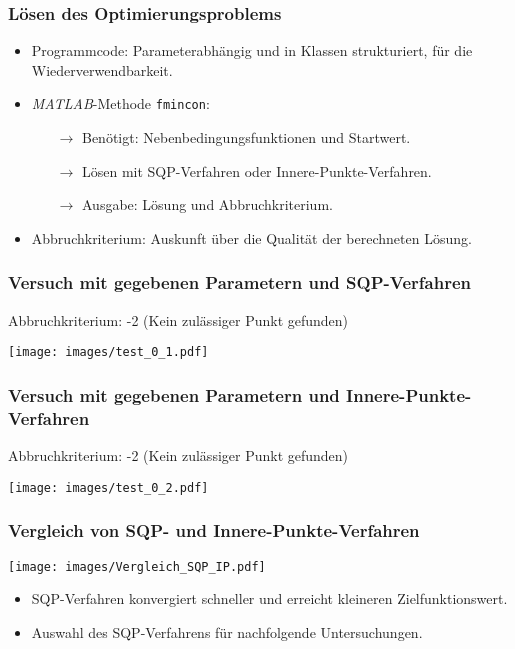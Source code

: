 \documentclass[aspectratio=169]{beamer}
\begin{document}
\begin{frame}
  	\frametitle{Lösen des Optimierungsproblems}
  	\begin{itemize}
  		\item Programmcode: Parameterabhängig und in Klassen strukturiert, für die Wiederverwendbarkeit.
  		\item \textit{MATLAB}-Methode \texttt{fmincon}:
  			\begin{itemize}
  				\item[\(\rightarrow\)] Benötigt: Nebenbedingungsfunktionen und Startwert.
      			\item[\(\rightarrow\)] Lösen mit SQP-Verfahren oder Innere-Punkte-Verfahren.
      			\item[\(\rightarrow\)] Ausgabe: Lösung und Abbruchkriterium.
    		\end{itemize}
    	\item Abbruchkriterium: Auskunft über die Qualität der berechneten Lösung.
  	\end{itemize}
\end{frame}

\begin{frame}
	\frametitle{Versuch mit gegebenen Parametern und SQP-Verfahren}
	Abbruchkriterium: -2 (Kein zulässiger Punkt gefunden)
  	\begin{center}
  		\texttt{[image: images/test\_0\_1.pdf]}
  	\end{center}
\end{frame}

\begin{frame}
	\frametitle{Versuch mit gegebenen Parametern und Innere-Punkte-Verfahren}
  	Abbruchkriterium: -2 (Kein zulässiger Punkt gefunden)
  	\begin{center}
  		\texttt{[image: images/test\_0\_2.pdf]}
  	\end{center}
\end{frame}

\begin{frame}
  	\frametitle{Vergleich von SQP- und Innere-Punkte-Verfahren}
  	\begin{center}
  		\texttt{[image: images/Vergleich\_SQP\_IP.pdf]}
  	\end{center}
  	\begin{itemize}
    	\item SQP-Verfahren konvergiert schneller und erreicht kleineren Zielfunktionswert.
    	\item Auswahl des SQP-Verfahrens für nachfolgende Untersuchungen.
  	\end{itemize}
\end{frame}
\end{document}
